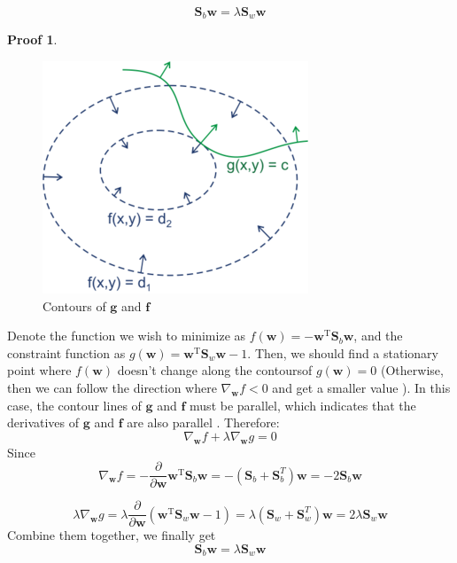 \documentclass[a4paper,UTF8]{article}
\numberwithin{equation}{section}
\theoremstyle{definition}
\newtheorem*{prove}{Proof}
\begin{document}
\begin{equation}
\label{dual}
\mathbf{S}_b\mathbf{w} = \lambda \mathbf{S}_w\mathbf{w}
\end{equation}
\begin{prove}

\begin{figure}[h]{}
\centering 
\includegraphics[scale=0.6]{1.png}
\caption{Contours of $\mathbf{g}$ and $\mathbf{f}$}
\end{figure} 
Denote the function we wish to minimize as $f(\mathbf{w}) = -\mathbf{w}^\mathrm{T} \mathbf{S}_b\mathbf{w}$, and the constraint function as  $g(\mathbf{w}) =  \mathbf{w}^\mathrm{T} \mathbf{S}_w\mathbf{w} - 1 $. 
Then, we should find a stationary point where $f(\mathbf{w}) $ doesn't change along the contours\footnotemark  of $g(\mathbf{w}) = 0$ (Otherwise, then we can follow the direction where $\nabla_{\mathbf{w}}f < 0 $ and get a smaller value ).   In this case, the contour lines of $\mathbf{g}$ and $\mathbf{f}$ must be parallel, which indicates that the derivatives of $\mathbf{g}$ and $\mathbf{f}$ are also parallel \footnotemark.  Therefore: 
\begin{equation}
\nabla_{\mathbf{w}} f + \lambda \nabla_{ \mathbf{w}} g = 0
\end{equation}
Since 
\begin{equation}
 \nabla_{\mathbf{w}} f = - \frac{ \partial}{\partial\mathbf{w} }\mathbf{w}^\mathrm{T} \mathbf{S}_b\mathbf{w}  = - (\mathbf{S}_b + \mathbf{S}_b^T) \mathbf{w} = -2 \mathbf{S}_b \mathbf{w} 
 \end{equation}
 
 \begin{equation}
 \lambda \nabla_{ \mathbf{w}} g = \lambda \frac{ \partial}{\partial\mathbf{w} }  (  \mathbf{w}^\mathrm{T} \mathbf{S}_w\mathbf{w} - 1) =\lambda (\mathbf{S}_w+ \mathbf{S}_w^T) \mathbf{w} = 2  \lambda\mathbf{S}_w \mathbf{w}
 \end{equation}
Combine them together, we finally get 
  \begin{equation}
  \mathbf{S}_b\mathbf{w} = \lambda \mathbf{S}_w\mathbf{w}
   \end{equation}


\end{prove}
\end{document}
